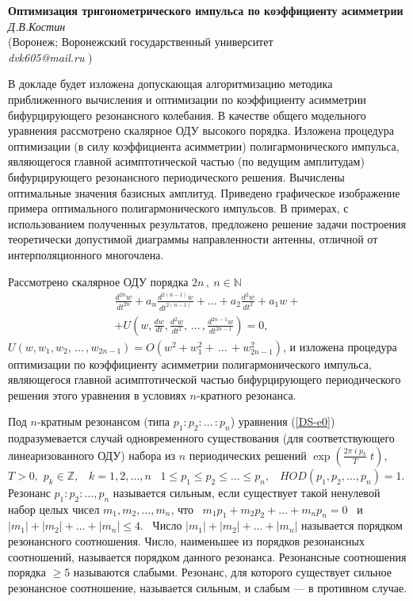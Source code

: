 \begin{center}{ \bf  Оптимизация
тригонометрического импульса по коэффициенту асимметрии}\\
{\it Д.В.Костин } \\
(Воронеж; Воронежский государственный университет\\
 {\it dvk605@mail.ru} )\\
\end{center}


 В докладе будет изложена допускающая алгоритмизацию методика приближенного вычисления и оптимизации по коэффициенту асимметрии бифурцирующего резонансного колебания. В качестве общего модельного уравнения рассмотрено скалярное ОДУ высокого порядка. Изложена  процедура оптимизации (в силу коэффициента асимметрии) полигармонического импульса, являющегося главной асимптотической частью (по ведущим амплитудам) бифурцирующего резонансного периодического решения. Вычислены оптимальные значения базисных амплитуд. Приведено графическое изображение примера оптимального полигармонического импульсов. В примерах, с использованием полученных результатов, предложено решение задачи построения теоретически допустимой диаграммы направленности антенны, отличной от интерполяционного многочлена.


Рассмотрено скалярное ОДУ порядка
$2n\,, \ n\in \mathbb{N}$
{\small
\begin{multline}\label{DS-e0}
\frac{d^{2n}w}{dt^{2n}}+ a_n\frac{d^{2(n-1)}w}{dt^{2(n-1)}}+ \dots +
a_2\frac{d^2w}{dt^2}+a_1w +
\\+
U \left(w,\frac{dw}{dt},
\frac{d^2w}{dt^2},\, \dots\,, \frac{d^{2n-1}w}{dt^{2n-1}}\right)
= 0,
\end{multline}}
$U(w,w_1, w_2,\, \dots\,, w_{2n-1})=O(w^2 + w_1^2+\, \dots\,
+w_{2n-1}^2)$, и изложена процедура оптимизации по коэффициенту
асимметрии полигармонического импульса, являющегося главной
асимптотической частью бифурцирующего периодического решения этого
уравнения в условиях $n$-кратного резонанса.

Под $n$-кратным резонансом (типа $p_1:p_2: \dots \,:p_n$) уравнения
(\ref{DS-e0}) подразумевается случай одновременного существования
(для соответствующего линеаризованного ОДУ) набора из $n$
периодических решений $\exp(\frac{2\pi\; i \;p_k}{T}\;t)$, \ $T >
0,$ $p_k\in \mathbb{Z},$ \ $k=1,2,\dots ,n$ \ $1\leqslant p_1 \leqslant p_2
\leqslant\dots \leqslant p_n,$ \ $HOD(p_1,p_2, \dots , p_n)=1$. Резонанс
$p_1:p_2:\dots , p_n$ называется сильным, если существует такой
ненулевой набор целых чисел $m_1,m_2,\dots , m_n$, что \
$m_1p_1+m_2p_2+ \dots + m_np_n=0$ \ и \ $|m_1|+|m_2|+ \dots +
|m_n|\leqslant 4.$ \ Число $|m_1|+|m_2|+ \dots + |m_n|$ называется
порядком резонансного соотношения. Число, наименьшее из порядков
резонансных соотношений, называется порядком данного резонанса.
Резонансные соотношения порядка $\geqslant 5$ называются слабыми.
Резонанс, для которого существует сильное резонансное соотношение,
называется сильным, и слабым --- в противном случае.

